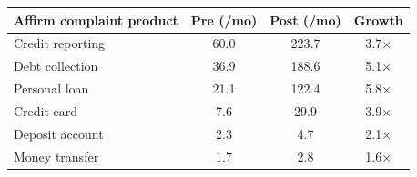 \begin{tabular}{lccc}
\toprule
Affirm complaint product & Pre (/mo) & Post (/mo) & Growth \\
\midrule
Credit reporting & 60.0 & 223.7 & 3.7$\times$ \\
Debt collection & 36.9 & 188.6 & 5.1$\times$ \\
Personal loan & 21.1 & 122.4 & 5.8$\times$ \\
Credit card & 7.6 & 29.9 & 3.9$\times$ \\
Deposit account & 2.3 & 4.7 & 2.1$\times$ \\
Money transfer & 1.7 & 2.8 & 1.6$\times$ \\
\bottomrule
\end{tabular}